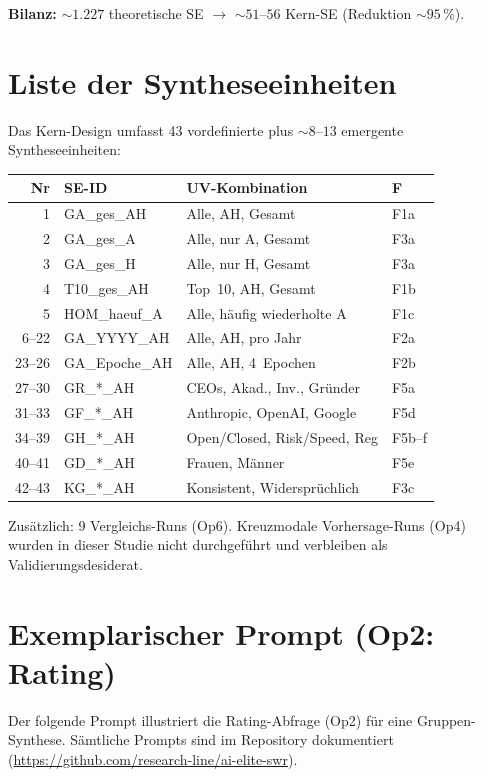 \documentclass[12pt,a4paper]{article}
\begin{document}
\textbf{Bilanz:} ${\sim}1.227$ theoretische SE $\to$ ${\sim}51$--$56$ Kern-SE (Reduktion ${\sim}95$\,\%).


\section{Liste der Syntheseeinheiten}
\label{app:se}

Das Kern-Design umfasst 43 vordefinierte plus ${\sim}8$--$13$ emergente Syntheseeinheiten:

{\small
\begin{tabular}{@{} r L{3.2cm} L{7.4cm} L{2.0cm} @{}}
  \toprule
  \textbf{Nr} & \textbf{SE-ID} & \textbf{UV-Kombination} & \textbf{F} \\
   & GA\_ges\_AH & Alle, AH, Gesamt & F1a \\
  2 & GA\_ges\_A & Alle, nur A, Gesamt & F3a \\
  3 & GA\_ges\_H & Alle, nur H, Gesamt & F3a \\
  4 & T10\_ges\_AH & Top~10, AH, Gesamt & F1b \\
  5 & HOM\_haeuf\_A & Alle, häufig wiederholte A & F1c \\
  6--22 & GA\_YYYY\_AH & Alle, AH, pro Jahr & F2a \\
  23--26 & GA\_Epoche\_AH & Alle, AH, 4~Epochen & F2b \\
  27--30 & GR\_*\_AH & CEOs, Akad., Inv., Gründer & F5a \\
  31--33 & GF\_*\_AH & Anthropic, OpenAI, Google & F5d \\
  34--39 & GH\_*\_AH & Open/Closed, Risk/Speed, Reg & F5b--f \\
  40--41 & GD\_*\_AH & Frauen, Männer & F5e \\
  42--43 & KG\_*\_AH & Konsistent, Widersprüchlich & F3c \\
  \bottomrule
\end{tabular}
}

Zusätzlich: 9 Vergleichs-Runs (Op6). Kreuzmodale Vorhersage-Runs (Op4) wurden in dieser Studie nicht durchgeführt und verbleiben als Validierungsdesiderat.


\section{Exemplarischer Prompt (Op2: Rating)}
\label{app:prompt}

Der folgende Prompt illustriert die Rating-Abfrage (Op2) für eine Gruppen-Synthese. Sämtliche Prompts sind im Repository dokumentiert (\url{https://github.com/research-line/ai-elite-swr}).
\end{document}

